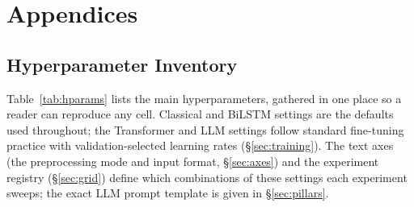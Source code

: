 \chapter{Appendices}
\label{ch:appendix}
\renewcommand{\thesection}{\Alph{section}}
\setcounter{section}{0}

\section{Hyperparameter Inventory}
\label{app:hparams}
Table~\ref{tab:hparams} lists the main hyperparameters, gathered in one place so a reader can reproduce
any cell. Classical and BiLSTM settings are the defaults used throughout; the Transformer and LLM
settings follow standard fine-tuning practice with validation-selected learning rates
(\S\ref{sec:training}). The text axes (the preprocessing mode and input format, \S\ref{sec:axes}) and the
experiment registry (\S\ref{sec:grid}) define which combinations of these settings each experiment
sweeps; the exact LLM prompt template is given in \S\ref{sec:pillars}.

